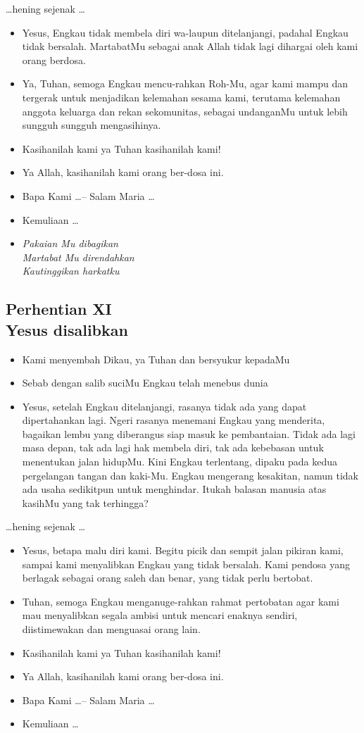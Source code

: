 \documentclass[a5paper,headsepline,titlepage,10pt,nnormalheadings,DIVcalc]{scrbook}
\newcommand{\BU}[1]{\begin{itemize} \item[U:] #1 \end{itemize}}
\newcommand{\BP}[1]{\begin{itemize} \item[P:] #1 \end{itemize}}
\newcommand{\BL}[1]{\begin{itemize} \item[L:] #1 \end{itemize}}
\begin{document}
\begin{center}\dots hening sejenak \dots\end{center}

\BP{Yesus, Engkau tidak membela diri wa-laupun ditelanjangi, padahal Engkau tidak bersalah. MartabatMu sebagai anak Allah tidak lagi dihargai oleh kami orang berdosa.}
\BU{Ya, Tuhan, semoga Engkau mencu-rahkan Roh-Mu, agar kami mampu dan tergerak untuk menjadikan kelemahan sesama kami, terutama kelemahan anggota keluarga dan rekan sekomunitas, sebagai undanganMu untuk lebih sungguh sungguh mengasihinya.}
\BP{Kasihanilah kami ya Tuhan kasihanilah kami!}
\BU{Ya Allah, kasihanilah kami orang ber-dosa ini.}
\BP{Bapa Kami \dots -- Salam Maria \dots}
\BP{Kemuliaan \dots}

\begin{itemize}
\item[11.] \it{Pakaian Mu dibagikan\\
Martabat Mu direndahkan\\
Kautinggikan harkatku}
\end{itemize}


\subsection*{Perhentian XI
\\Yesus disalibkan}

\BP{Kami menyembah Dikau, ya Tuhan dan bersyukur kepadaMu}
\BU{Sebab dengan salib suciMu Engkau telah menebus dunia}
\BL{Yesus, setelah Engkau ditelanjangi, rasanya tidak ada yang dapat dipertahankan lagi. Ngeri rasanya menemani Engkau yang menderita, bagaikan lembu yang diberangus siap masuk ke pembantaian. Tidak ada lagi masa depan, tak ada lagi hak membela diri, tak ada kebebasan untuk menentukan jalan hidupMu. Kini Engkau terlentang, dipaku pada kedua pergelangan tangan dan kaki-Mu. Engkau mengerang kesakitan, namun tidak ada usaha sedikitpun untuk menghindar. Itukah balasan manusia atas kasihMu yang tak terhingga?}

\begin{center}\dots hening sejenak \dots\end{center}

\BP{Yesus, betapa malu diri kami. Begitu picik dan sempit jalan pikiran kami, sampai kami menyalibkan Engkau yang tidak bersalah. Kami pendosa yang berlagak sebagai orang saleh dan benar, yang tidak perlu bertobat.}
\BU{Tuhan, semoga Engkau menganuge-rahkan rahmat pertobatan agar kami mau menyalibkan segala ambisi untuk mencari enaknya sendiri, diistimewakan dan menguasai orang lain.}
\BP{Kasihanilah kami ya Tuhan kasihanilah kami!}
\BU{Ya Allah, kasihanilah kami orang ber-dosa ini.}
\BP{Bapa Kami \dots -- Salam Maria \dots}
\BP{Kemuliaan \dots}
\end{document}
